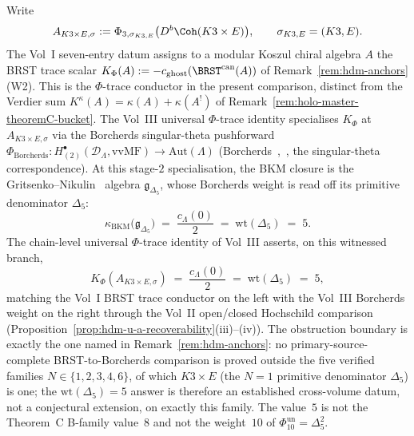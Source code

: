 \begin{remark}
\label{rem:holo-master-phi-trace}
Write
\[
 A_{K3\times E,\sigma}
 :=
 \Phi_{3,\sigma_{K3,E}}\bigl(D^b\Coh(K3\times E)\bigr),
 \qquad
 \sigma_{K3,E}=(K3,E).
\]
The Vol~I seven-entry datum assigns to a modular Koszul chiral algebra
$A$ the BRST trace scalar
$K_\Phi(A):=-c_{\mathrm{ghost}}(\BRST^{\mathrm{can}}(A))$
of Remark~\ref{rem:hdm-anchors}(W2). This is the $\Phi$-trace
conductor in the present comparison, distinct from the Verdier sum
$K^\kappa(A)=\kappa(A)+\kappa(A^!)$ of
Remark~\ref{rem:holo-master-theoremC-bucket}. The Vol~III universal
$\Phi$-trace identity specialises $K_\Phi$ at
$A_{K3\times E,\sigma}$ via the Borcherds singular-theta pushforward
$\Phi_{\mathrm{Borcherds}} \colon H^\bullet_{(2)}(\mathcal{D}_\Lambda,
\mathrm{vvMF}) \to \mathrm{Aut}(\Lambda)$
(Borcherds~\cite{Borcherds95},~\cite{Borcherds98}, the singular-theta
correspondence). At this stage-$2$ specialisation, the BKM closure is
the Gritsenko--Nikulin~\cite{GritsenkoNikulin98a} algebra
$\mathfrak{g}_{\Delta_5}$, whose Borcherds weight is read off its
primitive denominator $\Delta_5$:
\[
 \kappa_{\mathrm{BKM}}\bigl(\mathfrak{g}_{\Delta_5}\bigr)
 \;=\;
 \frac{c_\Lambda(0)}{2}
 \;=\;
 \mathrm{wt}(\Delta_5)
 \;=\;
 5.
\]
The chain-level universal $\Phi$-trace identity of Vol~III asserts,
on this witnessed branch,
\[
 K_\Phi(A_{K3\times E,\sigma})
 \;=\;
 \frac{c_\Lambda(0)}{2}
 \;=\;
 \mathrm{wt}(\Delta_5)
 \;=\;
 5,
\]
matching the Vol~I BRST trace conductor on the left with the Vol~III
Borcherds weight on the right through the Vol~II
open/closed Hochschild comparison
(Proposition~\ref{prop:hdm-u-a-recoverability}(iii)--(iv)). The
obstruction boundary is exactly the one named in
Remark~\ref{rem:hdm-anchors}: no primary-source-complete
BRST-to-Borcherds comparison is proved outside the five verified
families $N \in \{1,2,3,4,6\}$, of which $K3\times E$
(the $N=1$ primitive denominator $\Delta_5$) is one;
the $\mathrm{wt}(\Delta_5) = 5$ answer is therefore an established
cross-volume datum, not a conjectural extension, on exactly this
family. The value~$5$ is not the Theorem~C B-family value~$8$ and
not the weight~$10$ of $\Phi_{10}^{\mathrm{un}}=\Delta_5^2$.
\end{remark}

